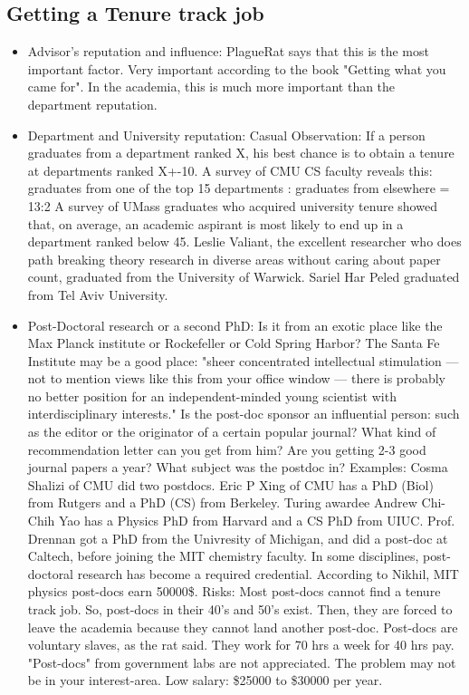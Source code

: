 \documentclass[oneside, article]{memoir}
\begin{document}
\subsection{Getting a Tenure track job}
\begin{itemize}
\item Advisor's reputation and influence:
\subitem PlagueRat says that this is the most important factor.
\subitem Very important according to the book "Getting what you came for". In the academia, this is much more important than the department reputation.

\item Department and University reputation:
\subitem Casual Observation: If a person graduates from a department ranked X, his best chance is to obtain a tenure at departments ranked X+-10.
\subitem A survey of CMU CS faculty reveals this:
\subsubitem graduates from one of the top 15 departments : graduates from elsewhere = 13:2
\subitem A survey of UMass graduates who acquired university tenure showed that, on average, an academic aspirant is most likely to end up in a department ranked below 45.
\subitem Leslie Valiant, the excellent researcher who does path breaking theory research in diverse areas without caring about paper count, graduated from the University of Warwick. Sariel Har Peled graduated from Tel Aviv University.

\item Post-Doctoral research or a second PhD:
\subitem Is it from an exotic place like the Max Planck institute or Rockefeller or Cold Spring Harbor?
\subitem The Santa Fe Institute may be a good place: "sheer concentrated intellectual stimulation — not to mention views like this from your office window — there is probably no better position for an independent-minded young scientist with interdisciplinary interests."
\subitem Is the post-doc sponsor an influential person: such as the editor or the originator of a certain popular journal?
\subitem What kind of recommendation letter can you get from him?
\subitem Are you getting 2-3 good journal papers a year?
\subitem What subject was the postdoc in?
\subitem Examples:
\subsubitem Cosma Shalizi of CMU did two postdocs.
\subsubitem Eric P Xing of CMU has a PhD (Biol) from Rutgers and a PhD (CS) from Berkeley.
\subsubitem Turing awardee Andrew Chi-Chih Yao has a Physics PhD from Harvard and a CS PhD from UIUC.
\subsubitem Prof. Drennan got a PhD from the Univresity of Michigan, and did a post-doc at Caltech, before joining the MIT chemistry faculty.
\subitem In some disciplines, post-doctoral research has become a required credential.
\subitem According to Nikhil, MIT physics post-docs earn 50000\$.
\subitem Risks:
\subsubitem Most post-docs cannot find a tenure track job. So, post-docs in their 40's and 50's exist. Then, they are forced to leave the academia because they cannot land another post-doc.
\subsubitem Post-docs are voluntary slaves, as the rat said. They work for 70 hrs a week for 40 hrs pay.
\subsubitem "Post-docs" from government labs are not appreciated.
\subsubitem The problem may not be in your interest-area.
\subsubitem Low salary: \$25000 to \$30000 per year.


\end{itemize}
\end{document}
